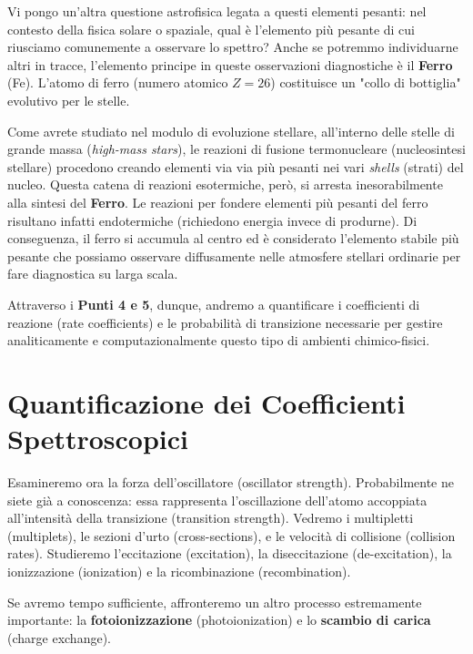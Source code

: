     Vi pongo un'altra questione astrofisica legata a questi elementi pesanti: nel contesto della fisica solare o spaziale, qual è l'elemento più pesante di cui riusciamo comunemente a osservare lo spettro?
    Anche se potremmo individuarne altri in tracce, l'elemento principe in queste osservazioni diagnostiche è il \textbf{Ferro} (Fe). L'atomo di ferro (numero atomico $Z=26$) costituisce un "collo di bottiglia" evolutivo per le stelle.
    
    Come avrete studiato nel modulo di evoluzione stellare, all'interno delle stelle di grande massa (\textit{high-mass stars}), le reazioni di fusione termonucleare (nucleosintesi stellare) procedono creando elementi via via più pesanti nei vari \textit{shells} (strati) del nucleo. Questa catena di reazioni esotermiche, però, si arresta inesorabilmente alla sintesi del \textbf{Ferro}.
    Le reazioni per fondere elementi più pesanti del ferro risultano infatti endotermiche (richiedono energia invece di produrne). Di conseguenza, il ferro si accumula al centro ed è considerato l'elemento stabile più pesante che possiamo osservare diffusamente nelle atmosfere stellari ordinarie per fare diagnostica su larga scala.
    
    Attraverso i \textbf{Punti 4 e 5}, dunque, andremo a quantificare i coefficienti di reazione (rate coefficients) e le probabilità di transizione necessarie per gestire analiticamente e computazionalmente questo tipo di ambienti chimico-fisici.

\section{Quantificazione dei Coefficienti Spettroscopici}

Esamineremo ora la forza dell'oscillatore (oscillator strength). Probabilmente ne siete già a conoscenza: essa rappresenta l'oscillazione dell'atomo accoppiata all'intensità della transizione (transition strength). Vedremo i multipletti (multiplets), le sezioni d'urto (cross-sections), e le velocità di collisione (collision rates). Studieremo l'eccitazione (excitation), la diseccitazione (de-excitation), la ionizzazione (ionization) e la ricombinazione (recombination).

Se avremo tempo sufficiente, affronteremo un altro processo estremamente importante: la \textbf{fotoionizzazione} (photoionization) e lo \textbf{scambio di carica} (charge exchange).

